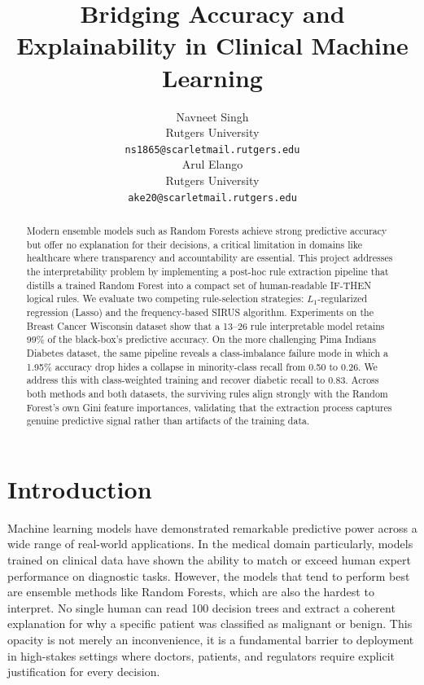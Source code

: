\documentclass[11pt]{article}
\title{Bridging Accuracy and Explainability in Clinical Machine Learning}
\author{Navneet Singh \\
  Rutgers University \\
  \texttt{ns1865@scarletmail.rutgers.edu} \\\And
  Arul Elango \\
  Rutgers University \\
  \texttt{ake20@scarletmail.rutgers.edu} \\}
\begin{document}
\maketitle

\begin{abstract}
Modern ensemble models such as Random Forests achieve strong predictive accuracy but offer no explanation for their decisions, a critical limitation in domains like healthcare where transparency and accountability are essential. This project addresses the interpretability problem by implementing a post-hoc rule extraction pipeline that distills a trained Random Forest into a compact set of human-readable IF-THEN logical rules. We evaluate two competing rule-selection strategies: $L_1$-regularized regression (Lasso) and the frequency-based SIRUS algorithm. Experiments on the Breast Cancer Wisconsin dataset show that a 13--26 rule interpretable model retains 99\% of the black-box's predictive accuracy. On the more challenging Pima Indians Diabetes dataset, the same pipeline reveals a class-imbalance failure mode in which a 1.95\% accuracy drop hides a collapse in minority-class recall from 0.50 to 0.26. We address this with class-weighted training and recover diabetic recall to 0.83. Across both methods and both datasets, the surviving rules align strongly with the Random Forest's own Gini feature importances, validating that the extraction process captures genuine predictive signal rather than artifacts of the training data.
\end{abstract}

\section{Introduction}

Machine learning models have demonstrated remarkable predictive power across a wide range of real-world applications. In the medical domain particularly, models trained on clinical data have shown the ability to match or exceed human expert performance on diagnostic tasks. However, the models that tend to perform best are ensemble methods like Random Forests, which are also the hardest to interpret. No single human can read 100 decision trees and extract a coherent explanation for why a specific patient was classified as malignant or benign. This opacity is not merely an inconvenience, it is a fundamental barrier to deployment in high-stakes settings where doctors, patients, and regulators require explicit justification for every decision.
\end{document}
